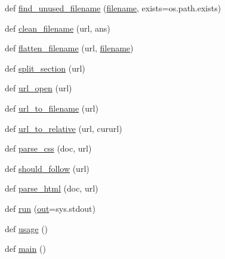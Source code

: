 \begin{DoxyCompactItemize}
\item 
def \hyperlink{namespacemw2html_adab857f7ebaddc5342d43d7f10acb153}{find\+\_\+unused\+\_\+filename} (\hyperlink{test__portburn_8cpp_a7efa5e9c7494c7d4586359300221aa5d}{filename}, exists=os.\+path.\+exists)
\item 
def \hyperlink{namespacemw2html_a1944832471b18b21842ada6439cebac2}{clean\+\_\+filename} (url, ans)
\item 
def \hyperlink{namespacemw2html_a48599fa7135b5a613fa08526fb4f106c}{flatten\+\_\+filename} (url, \hyperlink{test__portburn_8cpp_a7efa5e9c7494c7d4586359300221aa5d}{filename})
\item 
def \hyperlink{namespacemw2html_ac9cc6e591941431200a8a6144f6c07ae}{split\+\_\+section} (url)
\item 
def \hyperlink{namespacemw2html_afba16453097ddfddc93c62262a92b6b1}{url\+\_\+open} (url)
\item 
def \hyperlink{namespacemw2html_a01c99b6991283b01ed52497eeea077a4}{url\+\_\+to\+\_\+filename} (url)
\item 
def \hyperlink{namespacemw2html_aa9df5a585f89ff62d0804b2d3da56f2d}{url\+\_\+to\+\_\+relative} (url, cururl)
\item 
def \hyperlink{namespacemw2html_add2343a149c4f3bc33e714e0de40f1e1}{parse\+\_\+css} (doc, url)
\item 
def \hyperlink{namespacemw2html_ad1e85572c7c472fb58dd71c1183e00b5}{should\+\_\+follow} (url)
\item 
def \hyperlink{namespacemw2html_a46560afd89d32a4311c16a3d64741063}{parse\+\_\+html} (doc, url)
\item 
def \hyperlink{namespacemw2html_ab3aff4cd0096159010c6fc6b2338e8a6}{run} (\hyperlink{latency_8c_a71fd1c281affec034757279e4f91c50b}{out}=sys.\+stdout)
\item 
def \hyperlink{namespacemw2html_a8fc8d9b04bc7f0fbdf70c59d0cddfd3f}{usage} ()
\item 
def \hyperlink{namespacemw2html_a6af985057064513ae654f38bae83a83b}{main} ()
\end{DoxyCompactItemize}
